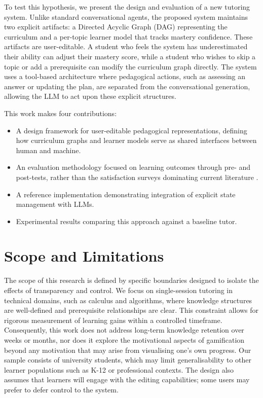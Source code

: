 \documentclass[logo,bsc,singlespacing,parskip,online]{infthesis}
\begin{document}
To test this hypothesis, we present the design and evaluation of a new tutoring system. Unlike standard conversational agents, the proposed system maintains two explicit artifacts: a Directed Acyclic Graph (DAG) representing the curriculum and a per-topic learner model that tracks mastery confidence. These artifacts are user-editable. A student who feels the system has underestimated their ability can adjust their mastery score, while a student who wishes to skip a topic or add a prerequisite can modify the curriculum graph directly. The system uses a tool-based architecture where pedagogical actions, such as assessing an answer or updating the plan, are separated from the conversational generation, allowing the LLM to act upon these explicit structures.

\noindent This work makes four contributions:
\begin{itemize}
\item A design framework for user-editable pedagogical representations, defining how curriculum graphs and learner models serve as shared interfaces between human and machine.
\item An evaluation methodology focused on learning outcomes through pre- and post-tests, rather than the satisfaction surveys dominating current literature \citep{chen2024chattutor}.
\item A reference implementation demonstrating integration of explicit state management with LLMs.
\item Experimental results comparing this approach against a baseline tutor.
\end{itemize}

\section{Scope and Limitations}

The scope of this research is defined by specific boundaries designed to isolate the effects of transparency and control. We focus on single-session tutoring in technical domains, such as calculus and algorithms, where knowledge structures are well-defined and prerequisite relationships are clear. This constraint allows for rigorous measurement of learning gains within a controlled timeframe. Consequently, this work does not address long-term knowledge retention over weeks or months, nor does it explore the motivational aspects of gamification beyond any motivation that may arise from visualising one's own progress. Our sample consists of university students, which may limit generalisability to other learner populations such as K-12 or professional contexts. The design also assumes that learners will engage with the editing capabilities; some users may prefer to defer control to the system.
\end{document}
